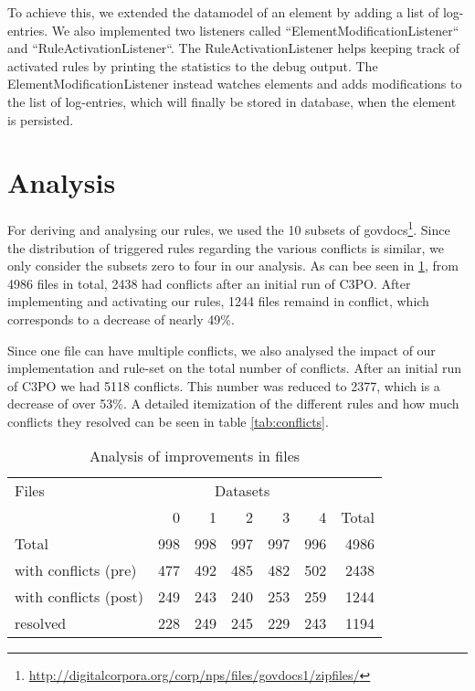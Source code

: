 \documentclass[a4paper,12pt]{article}
\begin{document}
To achieve this, we extended the datamodel of an element by adding a list of log-entries. We also implemented two listeners called ``ElementModificationListener`` and ``RuleActivationListener``. The RuleActivationListener helps keeping track of activated rules by printing the statistics to the debug output.
The ElementModificationListener instead watches elements and adds modifications to the list of log-entries, which will finally be stored in database, when the element is persisted.


\section{Analysis}

For deriving and analysing our rules, we used the 10 subsets of govdocs\footnote{\url{http://digitalcorpora.org/corp/nps/files/govdocs1/zipfiles/}}.
Since the distribution of triggered rules regarding the various conflicts is similar, we only consider the subsets zero to four in our analysis.
As can bee seen in \ref{tab:files}, from 4986 files in total, 2438 had conflicts after an initial run of C3PO. After implementing and activating our rules, 1244 files remaind in conflict, which corresponds to a decrease of nearly 49\%.

Since one file can have multiple conflicts, we also analysed the impact of our implementation and rule-set on the total number of conflicts.
After an initial run of C3PO we had 5118 conflicts. This number was reduced to 2377, which is a decrease of over 53\%.
A detailed itemization of the different rules and how much conflicts they resolved can be seen in table \ref{tab:conflicts}.

\begin{table}[ht]
\begin{center}

\begin{tabular}[h]{l||r|r|r|r|r||r}
Files &  \multicolumn{5}{c}{Datasets} \\
        & 0 & 1 & 2 & 3 & 4 & Total \\
\hline
Total & 998 & 998 & 997 & 997 & 996 & 4986\\ 
\hline
with conflicts (pre) & 477 &	492 & 485 & 482	& 502 &	2438\\ 
with conflicts (post) & 249	& 243 &	240 & 253 &	259 & 1244\\
\hline
resolved & 228 & 249 & 245 & 229 & 243 & 1194

\end{tabular}
\end{center}
\caption{Analysis of improvements in files}
\label{tab:files}
\end{table}
\end{document}
